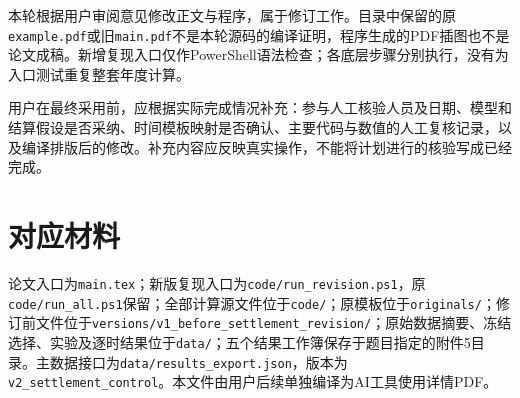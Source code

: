 \documentclass[UTF8,a4paper,11pt]{ctexart}
\begin{document}
本轮根据用户审阅意见修改正文与程序，属于修订工作。目录中保留的原\texttt{example.pdf}或旧\texttt{main.pdf}不是本轮源码的编译证明，程序生成的PDF插图也不是论文成稿。新增复现入口仅作PowerShell语法检查；各底层步骤分别执行，没有为入口测试重复整套年度计算。

用户在最终采用前，应根据实际完成情况补充：参与人工核验人员及日期、模型和结算假设是否采纳、时间模板映射是否确认、主要代码与数值的人工复核记录，以及编译排版后的修改。补充内容应反映真实操作，不能将计划进行的核验写成已经完成。

\section{对应材料}
论文入口为\texttt{main.tex}；新版复现入口为\texttt{code/run\_revision.ps1}，原\texttt{code/run\_all.ps1}保留；全部计算源文件位于\texttt{code/}；原模板位于\texttt{originals/}；修订前文件位于\texttt{versions/v1\_before\_settlement\_revision/}；原始数据摘要、冻结选择、实验及逐时结果位于\texttt{data/}；五个结果工作簿保存于题目指定的附件5目录。主数据接口为\texttt{data/results\_export.json}，版本为\texttt{v2\_settlement\_control}。本文件由用户后续单独编译为AI工具使用详情PDF。
\end{document}
